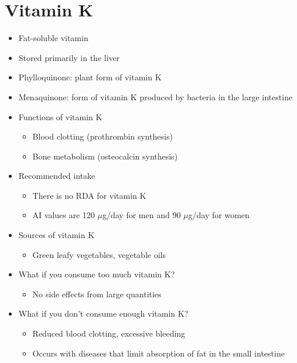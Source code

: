 \documentclass[title={Chapter 9}]{fdsn201notes}
\begin{document}
\section{Vitamin K}\label{sec:vitamin-k}
\begin{itemize}
	\item Fat-soluble vitamin
	\item Stored primarily in the liver
	\item Phylloquinone: plant form of vitamin K
	\item Menaquinone: form of vitamin K produced by bacteria in the large intestine
	\item Functions of vitamin K
	\begin{itemize}
		\item Blood clotting (prothrombin synthesis)
		\item Bone metabolism (osteocalcin synthesis)
	\end{itemize}
	\item Recommended intake
	\begin{itemize}
		\item There is no RDA for vitamin K
		\item AI values are 120 $\mu$g/day for men and 90 $\mu$g/day for women
	\end{itemize}
	\item Sources of vitamin K
	\begin{itemize}
		\item Green leafy vegetables, vegetable oils
	\end{itemize}
	\item What if you consume too much vitamin K?
	\begin{itemize}
		\item No side effects from large quantities
	\end{itemize}
	\item What if you don’t consume enough vitamin K?
	\begin{itemize}
		\item Reduced blood clotting, excessive bleeding
		\item Occurs with diseases that limit absorption of fat in the small intestine
	\end{itemize}
\end{itemize}
\end{document}
